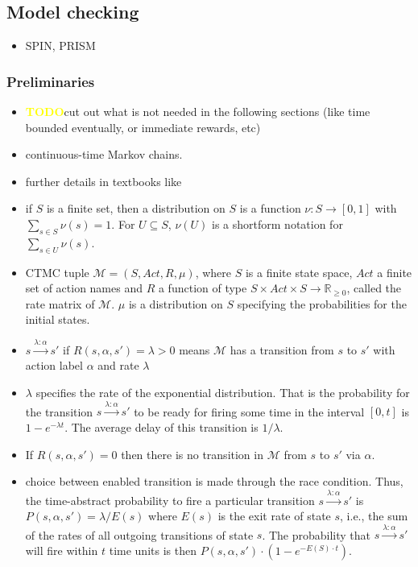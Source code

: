 \documentclass[a4paper, 10pt]{article}
\def \todo{\textbf{\textcolor{yellow}{TODO}}}
\begin{document}
\subsection{Model checking}
\label{ssec:analysis-modelchecking}
\begin{itemize}
	\item SPIN\cite{spin, hol97}, PRISM\cite{prism, knp09}
\end{itemize}

\subsubsection{Preliminaries}
\label{sssec:analysis-modelchecking-preliminaries}
\begin{itemize}
	\item \todo cut out what is not needed in the following sections (like time bounded eventually, or immediate rewards, etc)
	\item continuous-time Markov chains.
	\item further details in textbooks like \cite{kul95, ks76}
	\item if $S$ is a finite set, then a distribution on $S$ is a function $\nu:S \rightarrow [0,1]$ with $\sum\limits_{s \in S} \nu (s) = 1$. For $U \subseteq S$, $\nu (U)$ is a shortform notation for $\sum\limits_{s \in U} \nu (s)$.
	\item CTMC tuple $\mathcal{M} = (S, \mathit{Act}, R, \mu)$, where $S$ is a finite state space, $Act$ a finite set of action names and $R$ a function of type $S \times \mathit{Act} \times S \rightarrow \mathbb{R}_{\ge 0}$, called the rate matrix of $\mathcal{M}$. $\mu$ is a distribution on $S$ specifying the probabilities for the initial states.
	\item $s \xrightarrow{\lambda : \alpha} s'$ if $R(s, \alpha, s') = \lambda > 0$ means $\mathcal{M}$ has a transition from $s$ to $s'$ with action label $\alpha$ and rate $\lambda$
	\item $\lambda$ specifies the rate of the exponential distribution. That is the probability for the transition $s \xrightarrow{\lambda : \alpha} s'$ to be ready for firing some time in the interval $[0,t]$ is $1-e^{- \lambda t}$. The average delay  of this transition is $1 / \lambda$.
	\item If $R(s, \alpha, s') = 0$ then there is no transition in $\mathcal{M}$ from $s$ to $s'$ via $\alpha$.
	\item choice between enabled transition is made through the race condition. Thus, the time-abstract probability to fire a particular transition $s \xrightarrow{\lambda : \alpha} s'$ is $P(s, \alpha, s') = \lambda / E(s)$ where $E(s)$ is the exit rate of state $s$, i.e., the sum of the rates of all outgoing transitions of state $s$. The probability that $s \xrightarrow{\lambda : \alpha} s'$ will fire within $t$ time units is then $P(s, \alpha, s') \cdot (1 - e^{- E(S) \cdot t})$.

\end{itemize}
\end{document}
